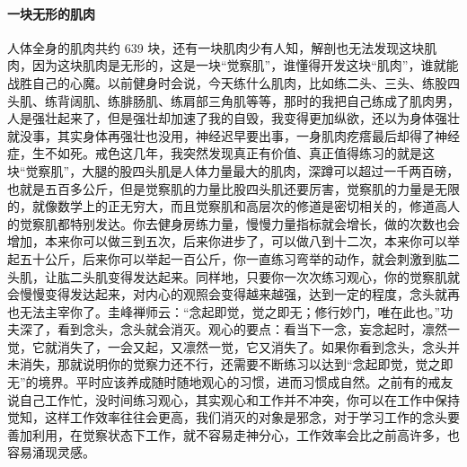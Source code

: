 \paragraph{一块无形的肌肉}

人体全身的肌肉共约 639 块，还有一块肌肉少有人知，解剖也无法发现这块肌肉，因为这块肌肉是无形的，这是一块“觉察肌”，谁懂得开发这块“肌肉”，谁就能战胜自己的心魔。以前健身时会说，今天练什么肌肉，比如练二头、三头、练股四头肌、练背阔肌、练腓肠肌、练肩部三角肌等等，那时的我把自己练成了肌肉男，人是强壮起来了，但是强壮却加速了我的自毁，我变得更加纵欲，还以为身体强壮就没事，其实身体再强壮也没用，神经迟早要出事，一身肌肉疙瘩最后却得了神经症，生不如死。戒色这几年，我突然发现真正有价值、真正值得练习的就是这块“觉察肌”，大腿的股四头肌是人体力量最大的肌肉，深蹲可以超过一千两百磅，也就是五百多公斤，但是觉察肌的力量比股四头肌还要厉害，觉察肌的力量是无限的，就像数学上的正无穷大，而且觉察肌和高层次的修道是密切相关的，修道高人的觉察肌都特别发达。你去健身房练力量，慢慢力量指标就会增长，做的次数也会增加，本来你可以做三到五次，后来你进步了，可以做八到十二次，本来你可以举起五十公斤，后来你可以举起一百公斤，你一直练习弯举的动作，就会刺激到肱二头肌，让肱二头肌变得发达起来。同样地，只要你一次次练习观心，你的觉察肌就会慢慢变得发达起来，对内心的观照会变得越来越强，达到一定的程度，念头就再也无法主宰你了。圭峰禅师云：“念起即觉，觉之即无；修行妙门，唯在此也。”功夫深了，看到念头，念头就会消灭。观心的要点：看当下一念，妄念起时，凛然一觉，它就消失了，一会又起，又凛然一觉，它又消失了。如果你看到念头，念头并未消失，那就说明你的觉察力还不行，还需要不断练习以达到“念起即觉，觉之即无”的境界。平时应该养成随时随地观心的习惯，进而习惯成自然。之前有的戒友说自己工作忙，没时间练习观心，其实观心和工作并不冲突，你可以在工作中保持觉知，这样工作效率往往会更高，我们消灭的对象是邪念，对于学习工作的念头要善加利用，在觉察状态下工作，就不容易走神分心，工作效率会比之前高许多，也容易涌现灵感。

